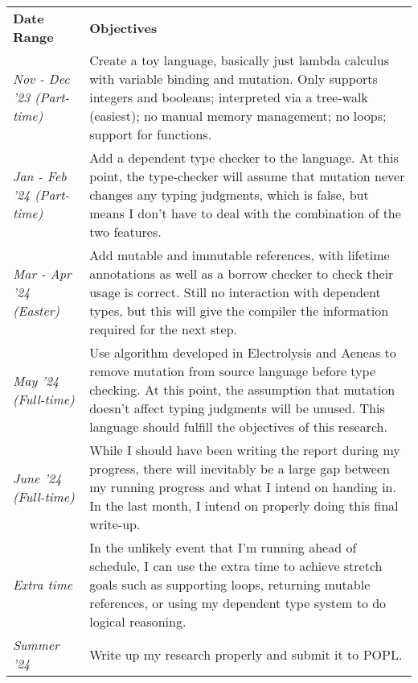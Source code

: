 \documentclass[12pt,twoside]{report}
\begin{document}
\begin{longtable}{p{}p{}}
  \toprule
  \addlinespace[-0.25em]
  \textbf{Date Range} & \textbf{Objectives} \\
  \addlinespace[-0.25em]
  \midrule
  \textsl{Nov - Dec '23 \newline (Part-time)} & Create a toy language, basically just lambda calculus with variable binding and mutation. Only supports integers and booleans; interpreted via a tree-walk (easiest); no manual memory management; no loops; support for functions.\\

  \textsl{Jan - Feb '24 \newline (Part-time)} & Add a dependent type checker to the language. At this point, the type-checker will assume that mutation never changes any typing judgments, which is false, but means I don't have to deal with the combination of the two features. \\

  \textsl{Mar - Apr '24 \newline (Easter)} & Add mutable and immutable references, with lifetime annotations as well as a borrow checker to check their usage is correct. Still no interaction with dependent types, but this will give the compiler the information required for the next step. \\

  \textsl{May '24 \newline (Full-time)} & Use algorithm developed in Electrolysis\cite{ullrich_khaelectrolysis_2024} and Aeneas\cite{aeneas} to remove mutation from source language before type checking. At this point, the assumption that mutation doesn't affect typing judgments will be unused. This language should fulfill the objectives of this research. \\

  \textsl{June '24 \newline (Full-time)} & While I should have been writing the report during my progress, there will inevitably be a large gap between my running progress and what I intend on handing in. In the last month, I intend on properly doing this final write-up. \\

  \textsl{Extra time} & In the unlikely event that I'm running ahead of schedule, I can use the extra time to achieve stretch goals such as supporting loops, returning mutable references, or using my dependent type system to do logical reasoning. \\

  \textsl{Summer '24} & Write up my research properly and submit it to POPL. \\

  \bottomrule
\end{longtable}
\end{document}
